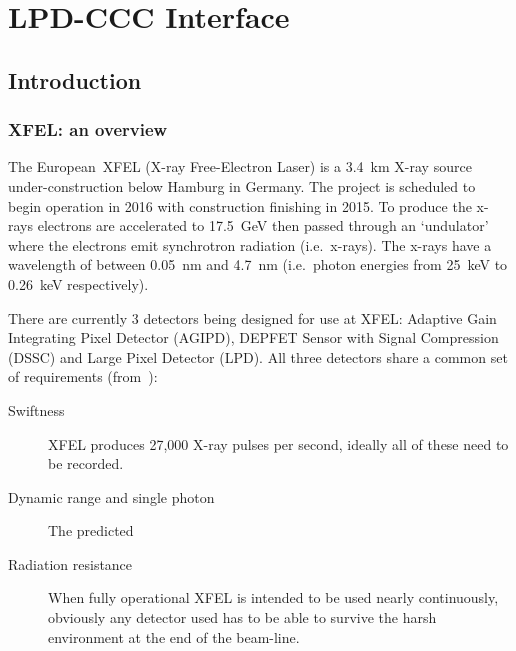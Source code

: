     \part{LPD-CCC Interface} %
    \label{prt:lpd_ccc_interface}
    
    \chapter{Introduction} %
    \label{cha:lpd_ccc_introduction}
    \section{XFEL: an overview} %
    \label{sec:xfel_an_overview}
    The European~XFEL (X-ray Free-Electron Laser) is a 3.4~km X-ray source under-construction below Hamburg in Germany. The project is scheduled to begin operation in 2016 with construction finishing in 2015. To produce the x-rays electrons are accelerated to 17.5~GeV then passed through an `undulator' where the electrons emit synchrotron radiation (i.e.\ x-rays). The x-rays have a wavelength of between 0.05~nm and 4.7~nm (i.e.\ photon energies from 25~keV to 0.26~keV respectively). 
    
    
    
    There are currently 3 detectors being designed for use at XFEL: Adaptive Gain Integrating Pixel Detector (AGIPD), DEPFET Sensor with Signal Compression (DSSC) and Large Pixel Detector (LPD). All three detectors share a common set of requirements (from~\cite{XFEL WEBSITE}):
    \begin{description}
        \item[Swiftness] XFEL produces 27,000 X-ray pulses per second, ideally all of these need to be recorded.
        \item[Dynamic range and single photon] The predicted 
        \item[Radiation resistance] When fully operational XFEL is intended to be used nearly continuously, obviously any detector used has to be able to survive the harsh environment at the end of the beam-line.
    \end{description}
